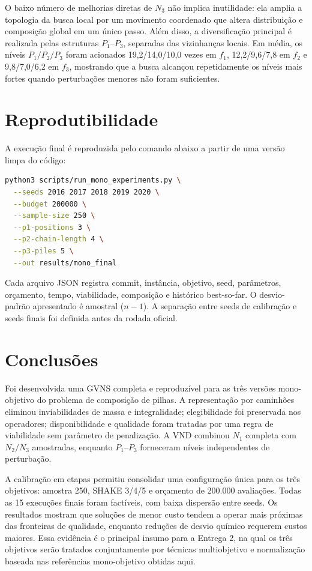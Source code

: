 \documentclass[10pt,twocolumn,a4paper]{article}
\begin{document}
O baixo número de melhorias diretas de $N_3$ não implica inutilidade: ela amplia a topologia da busca local por um movimento coordenado que altera distribuição e composição global em um único passo. Além disso, a diversificação principal é realizada pelas estruturas $P_1$--$P_3$, separadas das vizinhanças locais. Em média, os níveis $P_1/P_2/P_3$ foram acionados 19,2/14,0/10,0 vezes em $f_1$, 12,2/9,6/7,8 em $f_2$ e 9,8/7,0/6,2 em $f_3$, mostrando que a busca alcançou repetidamente os níveis mais fortes quando perturbações menores não foram suficientes.

\section{Reprodutibilidade}

A execução final é reproduzida pelo comando abaixo a partir de uma versão limpa do código:
\begin{lstlisting}[language=bash]
python3 scripts/run_mono_experiments.py \
  --seeds 2016 2017 2018 2019 2020 \
  --budget 200000 \
  --sample-size 250 \
  --p1-positions 3 \
  --p2-chain-length 4 \
  --p3-piles 5 \
  --out results/mono_final
\end{lstlisting}

Cada arquivo JSON registra commit, instância, objetivo, seed, parâmetros, orçamento, tempo, viabilidade, composição e histórico best-so-far. O desvio-padrão apresentado é amostral ($n-1$). A separação entre seeds de calibração e seeds finais foi definida antes da rodada oficial.

\section{Conclusões}

Foi desenvolvida uma GVNS completa e reproduzível para as três versões mono-objetivo do problema de composição de pilhas. A representação por caminhões eliminou inviabilidades de massa e integralidade; elegibilidade foi preservada nos operadores; disponibilidade e qualidade foram tratadas por uma regra de viabilidade sem parâmetro de penalização. A VND combinou $N_1$ completa com $N_2/N_3$ amostradas, enquanto $P_1$--$P_3$ forneceram níveis independentes de perturbação.

A calibração em etapas permitiu consolidar uma configuração única para os três objetivos: amostra 250, SHAKE 3/4/5 e orçamento de 200.000 avaliações. Todas as 15 execuções finais foram factíveis, com baixa dispersão entre seeds. Os resultados mostram que soluções de menor custo tendem a operar mais próximas das fronteiras de qualidade, enquanto reduções de desvio químico requerem custos maiores. Essa evidência é o principal insumo para a Entrega 2, na qual os três objetivos serão tratados conjuntamente por técnicas multiobjetivo e normalização baseada nas referências mono-objetivo obtidas aqui.
\end{document}
